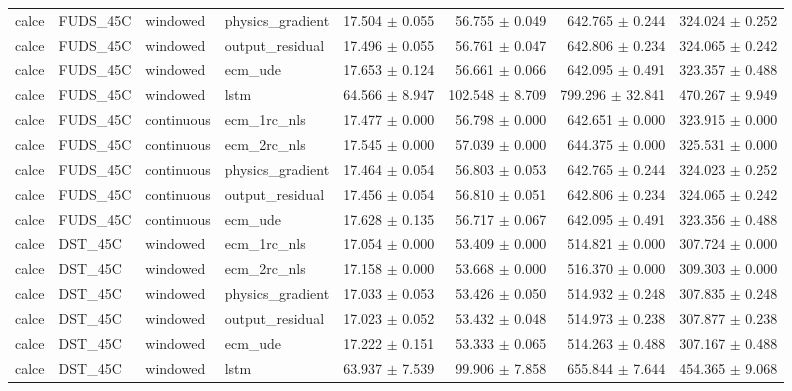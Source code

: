 \begin{longtable}{llllrrrr}
calce & FUDS\_45C & windowed & physics\_gradient & 17.504 $\pm$ 0.055 & 56.755 $\pm$ 0.049 & 642.765 $\pm$ 0.244 & 324.024 $\pm$ 0.252 \\
calce & FUDS\_45C & windowed & output\_residual & 17.496 $\pm$ 0.055 & 56.761 $\pm$ 0.047 & 642.806 $\pm$ 0.234 & 324.065 $\pm$ 0.242 \\
calce & FUDS\_45C & windowed & ecm\_ude & 17.653 $\pm$ 0.124 & 56.661 $\pm$ 0.066 & 642.095 $\pm$ 0.491 & 323.357 $\pm$ 0.488 \\
calce & FUDS\_45C & windowed & lstm & 64.566 $\pm$ 8.947 & 102.548 $\pm$ 8.709 & 799.296 $\pm$ 32.841 & 470.267 $\pm$ 9.949 \\
calce & FUDS\_45C & continuous & ecm\_1rc\_nls & 17.477 $\pm$ 0.000 & 56.798 $\pm$ 0.000 & 642.651 $\pm$ 0.000 & 323.915 $\pm$ 0.000 \\
calce & FUDS\_45C & continuous & ecm\_2rc\_nls & 17.545 $\pm$ 0.000 & 57.039 $\pm$ 0.000 & 644.375 $\pm$ 0.000 & 325.531 $\pm$ 0.000 \\
calce & FUDS\_45C & continuous & physics\_gradient & 17.464 $\pm$ 0.054 & 56.803 $\pm$ 0.053 & 642.765 $\pm$ 0.244 & 324.023 $\pm$ 0.252 \\
calce & FUDS\_45C & continuous & output\_residual & 17.456 $\pm$ 0.054 & 56.810 $\pm$ 0.051 & 642.806 $\pm$ 0.234 & 324.065 $\pm$ 0.242 \\
calce & FUDS\_45C & continuous & ecm\_ude & 17.628 $\pm$ 0.135 & 56.717 $\pm$ 0.067 & 642.095 $\pm$ 0.491 & 323.356 $\pm$ 0.488 \\
calce & DST\_45C & windowed & ecm\_1rc\_nls & 17.054 $\pm$ 0.000 & 53.409 $\pm$ 0.000 & 514.821 $\pm$ 0.000 & 307.724 $\pm$ 0.000 \\
calce & DST\_45C & windowed & ecm\_2rc\_nls & 17.158 $\pm$ 0.000 & 53.668 $\pm$ 0.000 & 516.370 $\pm$ 0.000 & 309.303 $\pm$ 0.000 \\
calce & DST\_45C & windowed & physics\_gradient & 17.033 $\pm$ 0.053 & 53.426 $\pm$ 0.050 & 514.932 $\pm$ 0.248 & 307.835 $\pm$ 0.248 \\
calce & DST\_45C & windowed & output\_residual & 17.023 $\pm$ 0.052 & 53.432 $\pm$ 0.048 & 514.973 $\pm$ 0.238 & 307.877 $\pm$ 0.238 \\
calce & DST\_45C & windowed & ecm\_ude & 17.222 $\pm$ 0.151 & 53.333 $\pm$ 0.065 & 514.263 $\pm$ 0.488 & 307.167 $\pm$ 0.488 \\
calce & DST\_45C & windowed & lstm & 63.937 $\pm$ 7.539 & 99.906 $\pm$ 7.858 & 655.844 $\pm$ 7.644 & 454.365 $\pm$ 9.068 \\

\end{longtable}

